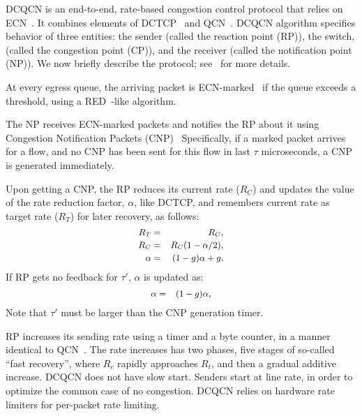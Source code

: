 DCQCN is an end-to-end, rate-based congestion control protocol that relies on
ECN~\cite{ecn}. It combines elements of DCTCP~\cite{dctcp} and QCN~\cite{qcn}.
DCQCN algorithm specifies behavior of three entities: the sender (called the
reaction point (RP)), the switch, (called the congestion point (CP)), and the
receiver (called the notification point (NP)). We now briefly describe the
protocol; see~\cite{dcqcn} for more details.

 At every egress queue, the arriving packet is
ECN-marked~\cite{ecn} if the queue exceeds a threshold, using a
RED~\cite{red}-like algorithm.

 The NP receives ECN-marked packets and notifies the RP about
it using Congestion Notification Packets (CNP)~\cite{rocev2} Specifically, if a
marked packet arrives for a flow, and no CNP has been sent for this flow in last
$\tau$ microseconds, a CNP is generated immediately.

 

Upon getting a CNP, the RP reduces its current rate ($R_C$)
and updates the value of the rate reduction factor, $\alpha$, like DCTCP, and
remembers current rate as target rate ($R_T$) for later recovery, as follows:
\begin{equation} 
\small 
\begin{aligned} 
R_T &=& R_C,	\\ 
R_C &=& R_C (1 -\alpha/2),  \\ 
\alpha &=& (1-g)\alpha + g, 
\end{aligned} 
\label{eq:rp_dec}
\end{equation} 
If RP gets no feedback for $\tau'$, $\alpha$ is updated as:
\begin{equation} 
\small 
\begin{aligned} 
\alpha &=& (1-g)\alpha, 
\end{aligned}
\label{eq:rp_alpha_recover} 
\end{equation}
Note that $\tau'$ must be larger than the CNP generation timer. 

RP increases its sending rate using a timer and a byte counter, in a manner
identical to QCN~\cite{qcn}. 
The rate increases has two phases, five stages of
so-called ``fast recovery'', where $R_c$ rapidly approaches $R_t$, and then a
gradual additive increase.  
DCQCN does not have slow start. Senders start at
line rate, in order to optimize the common case of no congestion. DCQCN relies
on hardware rate limiters for per-packet rate limiting. 
